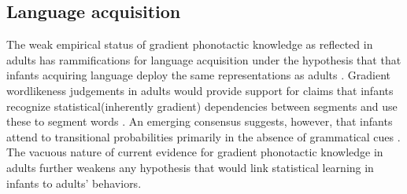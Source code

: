 \subsection{Language acquisition}

The weak empirical status of gradient phonotactic knowledge as reflected in adults has rammifications for language acquisition under the hypothesis that that infants acquiring language deploy the same representations as adults \citep[e.g.,][]{Macnamara1982,Pinker1984,Crain1991,Carey1995,deVilliers2001,Legate2007}. Gradient wordlikeness judgements in adults would provide support for claims that infants recognize statistical(inherently gradient) dependencies between segments \citep{Jusczyk1994} and use these to segment words \citep{Saffran1996}. An emerging consensus suggests, however, that infants attend to transitional probabilities primarily in the absence of grammatical cues \citep{Gambell2005,Hohne1994,Johnson2001,Jusczyk1999c,Lignos2012,Mattys2001a,Shukla2007,Lew-Williams2012}. The vacuous nature of current evidence for gradient phonotactic knowledge in adults further weakens any hypothesis that would link statistical learning in infants to adults' behaviors.


% 
% 
% 
